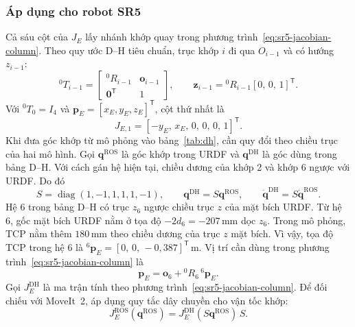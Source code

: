 \subsubsection*{Áp dụng cho robot SR5}
Cả sáu cột của \(J_E\) lấy nhánh khớp quay trong phương trình~\eqref{eq:sr5-jacobian-column}. Theo quy ước D--H tiêu chuẩn, trục khớp \(i\) đi qua \(O_{i-1}\) và có hướng \(z_{i-1}\):
\[
 {}^0T_{i-1}=
 \begin{bmatrix}{}^0R_{i-1}&\mathbf o_{i-1}\\\mathbf 0^{\mathsf T}&1\end{bmatrix},
 \qquad
 \mathbf z_{i-1}={}^0R_{i-1}[0,\,0,\,1]^{\mathsf T}.
\]
Với \({}^0T_0=I_4\) và \(\mathbf p_E=[x_E,y_E,z_E]^{\mathsf T}\), cột thứ nhất là
\[
 J_{E,1}=[-y_E,\,x_E,\,0,\,0,\,0,\,1]^{\mathsf T}.
\]
Khi đưa góc khớp từ mô phỏng vào bảng~\ref{tab:dh}, cần quy đổi theo chiều trục của hai mô hình. Gọi \(\mathbf q^{\mathrm{ROS}}\) là góc khớp trong URDF và \(\mathbf q^{\mathrm{DH}}\) là góc dùng trong bảng D--H. Với cách gán hệ hiện tại, chiều dương của khớp 2 và khớp 6 ngược với URDF. Do đó
\[
  S=\operatorname{diag}(1,-1,1,1,1,-1),\qquad
  \mathbf q^{\mathrm{DH}}=S\mathbf q^{\mathrm{ROS}},
  \qquad \dot{\mathbf q}^{\mathrm{DH}}=S\dot{\mathbf q}^{\mathrm{ROS}}.
\]
Hệ 6 trong bảng D--H có trục \(z_6\) ngược chiều trục \(z\) của mặt bích URDF. Từ hệ 6, gốc mặt bích URDF nằm ở tọa độ \(-2d_6=-207\,\mathrm{mm}\) dọc \(z_6\). Trong mô phỏng, TCP nằm thêm \(180\,\mathrm{mm}\) theo chiều dương của trục \(z\) mặt bích. Vì vậy, tọa độ TCP trong hệ 6 là \({}^6\mathbf p_E=[0,\,0,\,-0{,}387]^{\mathsf T}\,\mathrm{m}\). Vị trí cần dùng trong phương trình~\eqref{eq:sr5-jacobian-column} là
\[
  \mathbf p_E=\mathbf o_6+{}^0R_6\,{}^6\mathbf p_E.
\]
Gọi \(J_E^{\mathrm{DH}}\) là ma trận tính theo phương trình~\eqref{eq:sr5-jacobian-column}. Để đối chiếu với MoveIt~2, áp dụng quy tắc dây chuyền cho vận tốc khớp:
\begin{equation}
  J_E^{\mathrm{ROS}}(\mathbf q^{\mathrm{ROS}})
  = J_E^{\mathrm{DH}}(S\mathbf q^{\mathrm{ROS}})\,S.
  \label{eq:sr5-jacobian-ros}
\end{equation}
